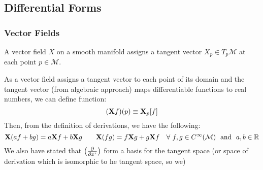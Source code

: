 \subsection{Differential Forms}
\subsubsection{Vector Fields}
\begin{definition}
  A vector field $X$ on a smooth manifold assigns a tangent vector $X_p\in T_p\mathcal{M}$ at each point $p\in \mathcal{M}$.
\end{definition}
As a vector field assigns a tangent vector to each point of its domain and the tangent vector (from algebraic approach) maps differentiable functions to real numbers, we can define function: 
$$(\boldsymbol{\mathbf{X}}f)(p) \equiv\boldsymbol{\mathbf{X}}_p[f]$$
Then, from the definition of derivations, we have the following:
$$\boldsymbol{\mathbf{X}}(af+bg)=a\boldsymbol{\mathbf{X}}f + b\boldsymbol{\mathbf{X}}g \quad \quad \boldsymbol{\mathbf{X}}(fg) = f\boldsymbol{\mathbf{X}}g + g\boldsymbol{\mathbf{X}}f\quad \forall \ f,g \in C^\infty(\mathcal{M}) \ \ \text{and}\ \ a,b\in\mathbb{R}$$
We also have stated that $\left( \pdv{x^i} \right)$ form a basis for the tangent space (or space of derivation which is isomorphic to he tangent space, so we)
